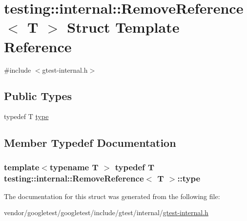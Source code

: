 \hypertarget{structtesting_1_1internal_1_1RemoveReference}{}\section{testing\+:\+:internal\+:\+:Remove\+Reference$<$ T $>$ Struct Template Reference}
\label{structtesting_1_1internal_1_1RemoveReference}


{\ttfamily \#include $<$gtest-\/internal.\+h$>$}

\subsection*{Public Types}
\begin{DoxyCompactItemize}
\item 
typedef T \hyperlink{structtesting_1_1internal_1_1RemoveReference_a9ca4f6499579225f7986b789ee4b2895}{type}
\end{DoxyCompactItemize}


\subsection{Member Typedef Documentation}
\subsubsection[{\texorpdfstring{type}{type}}]{\setlength{\rightskip}{0pt plus 5cm}template$<$typename T $>$ typedef T {\bf testing\+::internal\+::\+Remove\+Reference}$<$ T $>$\+::{\bf type}}\hypertarget{structtesting_1_1internal_1_1RemoveReference_a9ca4f6499579225f7986b789ee4b2895}{}\label{structtesting_1_1internal_1_1RemoveReference_a9ca4f6499579225f7986b789ee4b2895}


The documentation for this struct was generated from the following file\+:\begin{DoxyCompactItemize}
\item 
vendor/googletest/googletest/include/gtest/internal/\hyperlink{gtest-internal_8h}{gtest-\/internal.\+h}\end{DoxyCompactItemize}
